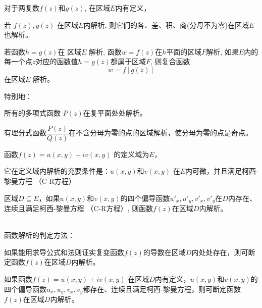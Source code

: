 \begin{theorem}\label{} \index{}
    对于两复数$f(z)$和$g(z)$, 在区域$E$内有定义， \\
    \begin{compactitem}
        \item 若 $f(z), g(z)$ 在区域$E$内解析, 
        则它们的各、差、积、商(分母不为零)在区域$E$也解析。
        \item 若函数$h = g(z)$在 区域$E$ 解析, 函数$w = f(z)$在$h$平面的区域$F$解析, 如果$E$内的每一个点$z$对应的函数值$ h=g(z)$都属于区域$F$, 则复合函数 
        \[ w = f[g(z)]\]
        在区域$E$ 解析。
    \end{compactitem}
\end{theorem}
特别地： \\
\begin{inparaenum}[(i)]
    \item 所有的多项式函数 $P(z)$在复平面处处解析。\\
    \item 有理分式函数$\dfrac{P(z)}{Q(z)}$在不含分母为零的点的区域解析，使分母为零的点是奇点。\\
\end{inparaenum}

\begin{theorem}\label{} \index{}
    函数$f(z) =u(x,y) +iv(x,y)$ 的定义域为$E$，
    \begin{compactitem}
    \item 它在定义域内解析的充要条件是：$u(x,y)$和$v(x,y)$ 在$E$内可微，并且满足柯西-黎曼方程 （C-R方程）
     \item  区域$D \subseteq E $，如果$u(x,y)$和$v(x,y)$的四个偏导函数$u'_x, u'_y, v'_x, v'_y$在$D$内存在、连续且满足柯西-黎曼方程 （C-R方程）, 则函数$f(z)$在区域$D$内解析。 
    \end{compactitem}
\end{theorem}
~\\
函数解析的判定方法：
\begin{compactitem}
    \item 如果能用求导公式和法则证实复变函数$f(z)$的导数在区域$D$内处处存在，则可断定函数$f(z)$在区域$D$内解析。
    \item 如果函数$f(z) =u(x,y) +iv(x,y)$ 在区域$D$内有定义，$u(x,y)$和$v(x,y)$的四个偏导函数$u_x, u_y, v_x, v_y$都存在、连续且满足柯西-黎曼方程，则可断定函数$f(z)$在区域$D$内解析。
\end{compactitem}

